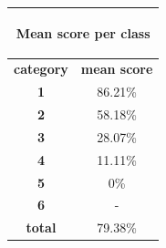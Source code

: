\documentclass[c]{beamer}
\begin{document}
\begin{frame}
\begin{columns}
\begin{column}{0.5\textwidth}
\begin{overlayarea}{\linewidth}{2cm}
\begin{table}
\begin{center}
\begin{adjustbox}{max width=0.4\textwidth}
{\begin{tabular}{|c|c|}
      \multicolumn{2}{|c|}{\begin{bf}Mean score per class\end{bf}} \\
      \hline
      \textbf{category} & \textbf{mean score}\\
      \hline
      \textbf{1} & 86.21\% \\
      \hline
      \textbf{2} & 58.18\% \\
      \hline
      \textbf{3} & 28.07\% \\
      \hline
      \textbf{4} & 11.11\% \\
      \hline
      \textbf{5} & 0\% \\
      \hline
      \textbf{6} & - \\
      \hline
      \textbf{total} & 79.38\% \\
      \hline
    \end{tabular}
    }
    \end{adjustbox}
    \end{center}
  \end{table}
  \end{overlayarea}
\end{column}
\end{columns}
\end{frame}
\end{document}
